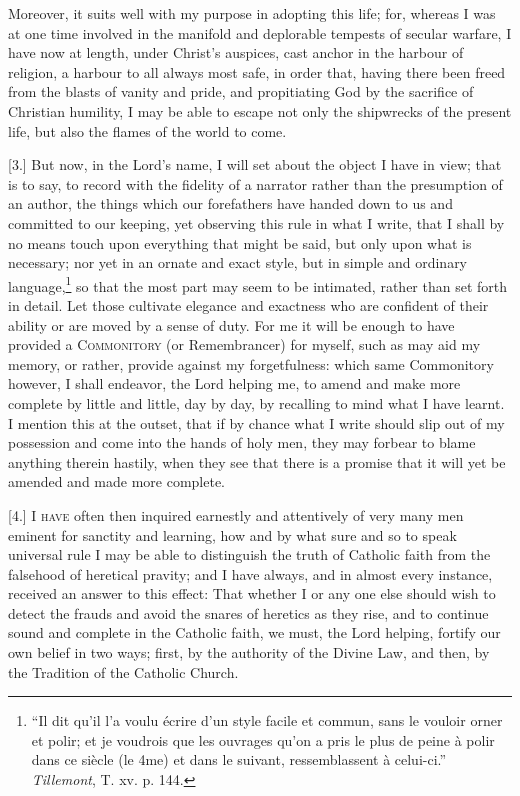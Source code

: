Moreover, it suits well with my purpose in adopting this life; for, whereas I was at one time involved in the manifold and deplorable tempests of secular warfare, I have now at length, under Christ’s auspices, cast anchor in the harbour of religion, a harbour to all always most safe, in order that, having there been freed from the blasts of vanity and pride, and propitiating God by the sacrifice of Christian humility, I may be able to escape not only the shipwrecks of the present life, but also the flames of the world to come.

[3.] But now, in the Lord’s name, I will set about the object I have in view; that is to say, to record with the fidelity of a narrator rather than the presumption of an author, the things which our forefathers have handed down to us and committed to our keeping, yet observing this rule in what I write, that I shall by no means touch upon everything that might be said, but only upon what is necessary; nor yet in an ornate and exact style, but in simple and ordinary language,\footnote{“Il dit qu’il l’a voulu écrire d’un style facile et commun, sans le vouloir orner et polir; et je voudrois que les ouvrages qu’on a pris le plus de peine à polir dans ce siècle (le 4me) et dans le suivant, ressemblassent à celui-ci.” \emph{Tillemont}, T. xv. p. 144.} so that the most part may seem to be intimated, rather than set forth in detail. Let those cultivate elegance and exactness who are confident of their ability or are moved by a sense of duty. For me it will be enough to have provided a \textsc{Commonitory} (or Remembrancer) for myself, such as may aid my memory, or rather, provide against my forgetfulness: which same Commonitory however, I shall endeavor, the Lord helping me, to amend and make more complete by little and little, day by day, by recalling to mind what I have learnt. I mention this at the outset, that if by chance what I write should slip out of my possession and come into the hands of holy men, they may forbear to blame anything therein hastily, when they see that there is a promise that it will yet be amended and made more complete.


[4.] \textsc{I have} often then inquired earnestly and attentively of very many men eminent for sanctity and learning, how and by what sure and so to speak universal rule I may be able to distinguish the truth of Catholic faith from the falsehood of heretical pravity; and I have always, and in almost every instance, received an answer to this effect: That whether I or any one else should wish to detect the frauds and avoid the snares of heretics as they rise, and to continue sound and complete in the Catholic faith, we must, the Lord helping, fortify our own belief in two ways; first, by the authority of the Divine Law, and then, by the Tradition of the Catholic Church.

